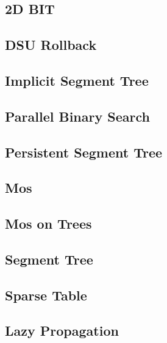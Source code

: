 \subsection{   2D BIT}
\raggedbottom
\hrulefill
\subsection{   DSU Rollback}
\raggedbottom
\hrulefill
\subsection{   Implicit Segment Tree}
\raggedbottom
\hrulefill
\subsection{   Parallel Binary Search}
\raggedbottom
\hrulefill
\subsection{   Persistent Segment Tree}
\raggedbottom
\hrulefill
\subsection{   Mos}
\raggedbottom
\hrulefill
\subsection{   Mos on Trees}
\raggedbottom
\hrulefill
\subsection{   Segment Tree}
\raggedbottom
\hrulefill
\subsection{   Sparse Table}
\raggedbottom
\hrulefill
\subsection{   Lazy Propagation}
\raggedbottom
\hrulefill

